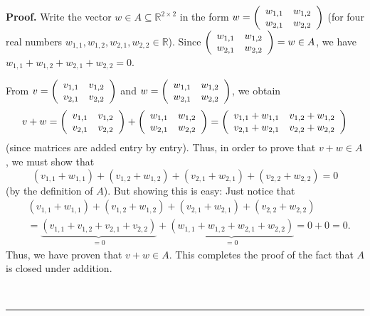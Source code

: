 \documentclass[numbers=enddot,12pt,final,onecolumn,notitlepage]{scrartcl}%
\theoremstyle{definition}
\newenvironment{proof}[1][Proof]{\noindent\textbf{#1.} }{\ \rule{0.5em}{0.5em}}
\begin{document}
\begin{proof}
Write the vector $w\in A\subseteq\mathbb{R}^{2\times2}$ in the form $w=\left(
%
\begin{array}
[c]{cc}%
w_{1,1} & w_{1,2}\\
w_{2,1} & w_{2,2}%
\end{array}
\right)  $ (for four real numbers $w_{1,1},w_{1,2},w_{2,1},w_{2,2}%
\in\mathbb{R}$). Since $\left(
\begin{array}
[c]{cc}%
w_{1,1} & w_{1,2}\\
w_{2,1} & w_{2,2}%
\end{array}
\right)  =w\in A$, we have $w_{1,1}+w_{1,2}+w_{2,1}+w_{2,2}=0$.

From $v=\left(
\begin{array}
[c]{cc}%
v_{1,1} & v_{1,2}\\
v_{2,1} & v_{2,2}%
\end{array}
\right)  $ and $w=\left(
\begin{array}
[c]{cc}%
w_{1,1} & w_{1,2}\\
w_{2,1} & w_{2,2}%
\end{array}
\right)  $, we obtain%
\[
v+w=\left(
\begin{array}
[c]{cc}%
v_{1,1} & v_{1,2}\\
v_{2,1} & v_{2,2}%
\end{array}
\right)  +\left(
\begin{array}
[c]{cc}%
w_{1,1} & w_{1,2}\\
w_{2,1} & w_{2,2}%
\end{array}
\right)  =\left(
\begin{array}
[c]{cc}%
v_{1,1}+w_{1,1} & v_{1,2}+w_{1,2}\\
v_{2,1}+w_{2,1} & v_{2,2}+w_{2,2}%
\end{array}
\right)
\]
(since matrices are added entry by entry). Thus, in order to prove that
$v+w\in A$, we must show that
\[
\left(  v_{1,1}+w_{1,1}\right)  +\left(  v_{1,2}+w_{1,2}\right)  +\left(
v_{2,1}+w_{2,1}\right)  +\left(  v_{2,2}+w_{2,2}\right)  =0
\]
(by the definition of $A$). But showing this is easy: Just notice that%
\begin{align*}
&  \left(  v_{1,1}+w_{1,1}\right)  +\left(  v_{1,2}+w_{1,2}\right)  +\left(
v_{2,1}+w_{2,1}\right)  +\left(  v_{2,2}+w_{2,2}\right) \\
&  =\underbrace{\left(  v_{1,1}+v_{1,2}+v_{2,1}+v_{2,2}\right)  }%
_{=0}+\underbrace{\left(  w_{1,1}+w_{1,2}+w_{2,1}+w_{2,2}\right)  }%
_{=0}=0+0=0.
\end{align*}
Thus, we have proven that $v+w\in A$. This completes the proof of the fact
that $A$ is closed under addition.


\end{proof}
\end{document}
